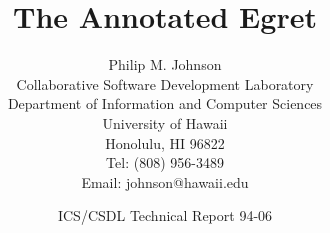 


\title{The Annotated Egret}

\author{Philip M. Johnson\\
  Collaborative Software Development Laboratory\\
  Department of Information and Computer Sciences\\
  University of Hawaii\\
  Honolulu, HI 96822\\
  Tel: (808) 956-3489\\
  Email: johnson@hawaii.edu}

\date{ICS/CSDL Technical Report 94-06}

\maketitle 
